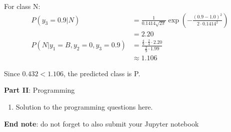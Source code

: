 \documentclass{article}
\begin{document}
\begin{enumerate}[leftmargin=\labelsep]
\begin{enumerate}
    
    For class N:
    \begin{align*}
    P(y_3=0.9 | N) &= \frac{1}{0.1414 \sqrt{2\pi}} \exp\left(-\frac{(0.9 - 1.0)^2}{2 \cdot 0.1414^2}\right) \\[10pt]
    &= 2.20\\
    P(N | y_1=B, y_2=0, y_3=0.9) &= \frac{\frac{4}{9} \cdot \frac{2}{4} \cdot 2.20}{\frac{2}{9} \cdot 1.99} \\[10pt]
    &\approx 1.106
    \end{align*}
    
    Since $0.432 < 1.106$, the predicted class is P.
\end{enumerate}

\end{enumerate}

\large{\textbf{Part II}: Programming}\normalsize

\begin{enumerate}[leftmargin=\labelsep,resume]
\item Solution to the programming questions here.
\end{enumerate}

\vskip 1cm
\textbf{End note}: do not forget to also submit your Jupyter notebook

\newpage

\end{document}
